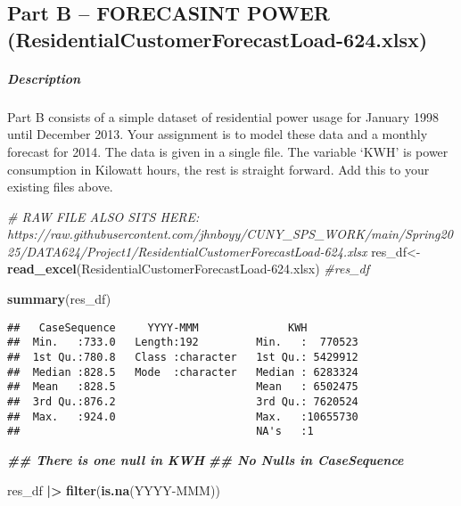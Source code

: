 \documentclass[
]{article}
\newenvironment{Shaded}{\begin{snugshade}}{\end{snugshade}}
\newcommand{\CommentTok}[1]{\textcolor[rgb]{0.56,0.35,0.01}{\textit{#1}}}
\newcommand{\DocumentationTok}[1]{\textcolor[rgb]{0.56,0.35,0.01}{\textbf{\textit{#1}}}}
\newcommand{\FunctionTok}[1]{\textcolor[rgb]{0.13,0.29,0.53}{\textbf{#1}}}
\newcommand{\NormalTok}[1]{#1}
\newcommand{\OtherTok}[1]{\textcolor[rgb]{0.56,0.35,0.01}{#1}}
\newcommand{\SpecialCharTok}[1]{\textcolor[rgb]{0.81,0.36,0.00}{\textbf{#1}}}
\newcommand{\StringTok}[1]{\textcolor[rgb]{0.31,0.60,0.02}{#1}}
\begin{document}
\subsection{Part B -- FORECASINT POWER
(ResidentialCustomerForecastLoad-624.xlsx)}\label{part-b-forecasint-power-residentialcustomerforecastload-624.xlsx}

\subparagraph{Description}\label{description-1}

Part B consists of a simple dataset of residential power usage for
January 1998 until December 2013. Your assignment is to model these data
and a monthly forecast for 2014. The data is given in a single file. The
variable `KWH' is power consumption in Kilowatt hours, the rest is
straight forward. Add this to your existing files above.

\begin{Shaded}
\begin{Highlighting}[]
\CommentTok{\# RAW FILE ALSO SITS HERE: https://raw.githubusercontent.com/jhnboyy/CUNY\_SPS\_WORK/main/Spring2025/DATA624/Project1/ResidentialCustomerForecastLoad{-}624.xlsx}
\NormalTok{res\_df}\OtherTok{\textless{}{-}}\FunctionTok{read\_excel}\NormalTok{(}\StringTok{\textquotesingle{}ResidentialCustomerForecastLoad{-}624.xlsx\textquotesingle{}}\NormalTok{)}
\CommentTok{\#res\_df}
\end{Highlighting}
\end{Shaded}

\begin{Shaded}
\begin{Highlighting}[]
\FunctionTok{summary}\NormalTok{(res\_df)}
\end{Highlighting}
\end{Shaded}

\begin{verbatim}
##   CaseSequence     YYYY-MMM              KWH          
##  Min.   :733.0   Length:192         Min.   :  770523  
##  1st Qu.:780.8   Class :character   1st Qu.: 5429912  
##  Median :828.5   Mode  :character   Median : 6283324  
##  Mean   :828.5                      Mean   : 6502475  
##  3rd Qu.:876.2                      3rd Qu.: 7620524  
##  Max.   :924.0                      Max.   :10655730  
##                                     NA's   :1
\end{verbatim}

\begin{Shaded}
\begin{Highlighting}[]
\DocumentationTok{\#\# There is one null in KWH}
\DocumentationTok{\#\# No Nulls in CaseSequence}

\NormalTok{res\_df }\SpecialCharTok{|\textgreater{}} \FunctionTok{filter}\NormalTok{(}\FunctionTok{is.na}\NormalTok{(}\StringTok{\textquotesingle{}YYYY{-}MMM\textquotesingle{}}\NormalTok{))}
\end{Highlighting}
\end{Shaded}
\end{document}
